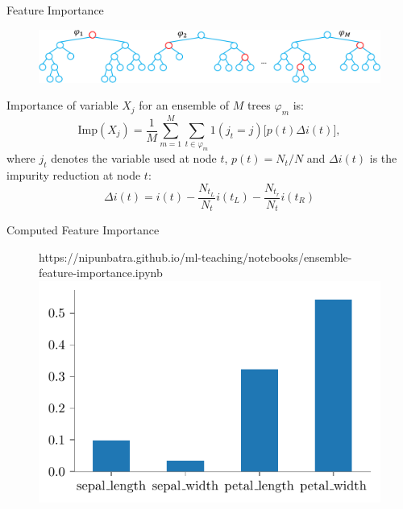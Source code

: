 \documentclass{beamer}
\begin{document}
\begin{frame}{Feature Importance\footnotemark}
  \begin{figure}
    \includegraphics[scale=0.4]{../assets/ensemble/diagrams/mdi.pdf}
  \end{figure}
  Importance of variable $X_j$ for an ensemble of $M$ trees $\varphi_{m}$ is:
  \begin{equation*}
    \text{Imp}(X_j) = \frac{1}{M} \sum_{m=1}^M \sum_{t \in \varphi_{m}} 1(j_t = j) \Big[ p(t) \Delta i(t) \Big],
  \end{equation*}
  where $j_t$ denotes the variable used at node $t$, $p(t)=N_t/N$ and $\Delta i(t)$ is the impurity reduction at node $t$:
  \begin{equation*}
    \Delta i(t) = i(t) - \frac{N_{t_L}}{N_t} i(t_L) - \frac{N_{t_r}}{N_t} i(t_R)
  \end{equation*}

\end{frame}


\begin{frame}{Computed Feature Importance}
  \begin{figure}[htp]
    \centering
    \begin{notebookbox}{https://nipunbatra.github.io/ml-teaching/notebooks/ensemble-feature-importance.ipynb}
      \includegraphics[scale=0.8]{../assets/ensemble/figures/feature-imp-forest.pdf}
    \end{notebookbox}
\end{figure}
\end{frame}
\end{document}
